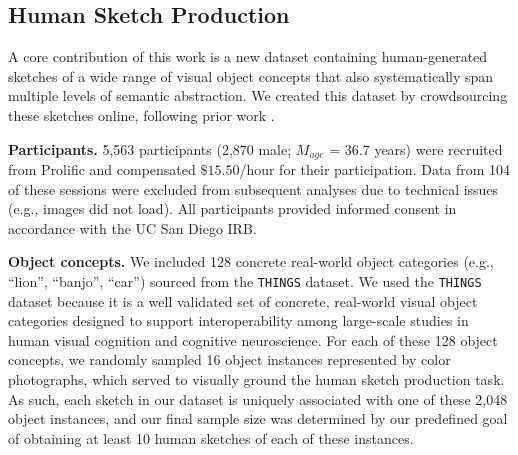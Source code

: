 \documentclass{article}
\begin{document}
\subsection{Human Sketch Production}

A core contribution of this work is a new dataset containing human-generated sketches of a wide range of visual object concepts that also systematically span multiple levels of semantic abstraction. 
We created this dataset by crowdsourcing these sketches online, following prior work \cite{fan2018common, yu2016sketch, sangkloy2016sketchy, fan2020pragmatic, hawkins2023visual,jongejan2017quick}.

\textbf{Participants.} 
5,563 participants (2,870 male; $M_{age}$ = 36.7 years) were recruited from Prolific and compensated $\$15.50$/hour for their participation.
Data from 104 of these sessions were excluded from subsequent analyses due to technical issues (e.g., images did not load). 
All participants provided informed consent in accordance with the UC San Diego IRB.

\textbf{Object concepts.} We included 128 concrete real-world object categories (e.g., ``lion'', ``banjo'', ``car'') sourced from the \texttt{THINGS} dataset. 
We used the \texttt{THINGS} dataset \cite{hebart2019things, hebart2023things} because it is a well validated set of concrete, real-world visual object categories designed to support interoperability among large-scale studies in human visual cognition and cognitive neuroscience.
For each of these 128 object concepts, we randomly sampled 16 object instances represented by color photographs, which served to visually ground the human sketch production task. 
As such, each sketch in our dataset is uniquely associated with one of these 2,048 object instances, and our final sample size was determined by our predefined goal of obtaining at least 10 human sketches of each of these instances. 
\end{document}
